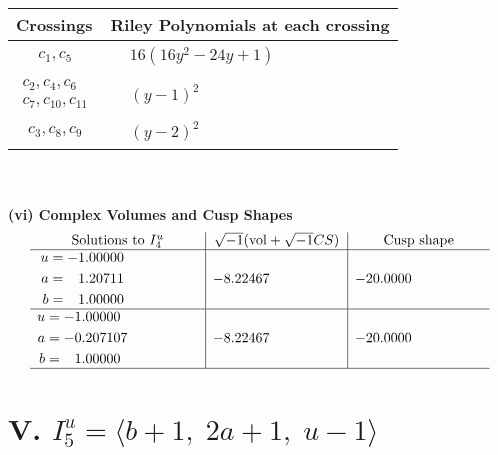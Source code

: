 \documentclass[1p]{elsarticle_modified}
\theoremstyle{definition}
\newcommand{\I}{\sqrt{-1}}
\begin{document}
\begin{tabular}{m{50pt}|m{274pt}}
Crossings & \hspace{64pt}Riley Polynomials at each crossing \\
\hline $$\begin{aligned}c_{1},c_{5}\end{aligned}$$&$\begin{aligned}
&16(16 y^2-24 y+1)
\end{aligned}$\\
\hline $$\begin{aligned}c_{2},c_{4},c_{6}\\c_{7},c_{10},c_{11}\end{aligned}$$&$\begin{aligned}
&(y-1)^2
\end{aligned}$\\
\hline $$\begin{aligned}c_{3},c_{8},c_{9}\end{aligned}$$&$\begin{aligned}
&(y-2)^2
\end{aligned}$\\
\hline
\end{tabular}\\~\\
\newpage\flushleft \textbf{(vi) Complex Volumes and Cusp Shapes}
$$\begin{array}{c|c|c}  
\text{Solutions to }I^u_{4}& \I (\text{vol} + \sqrt{-1}CS) & \text{Cusp shape}\\
 \hline 
\begin{aligned}
u &= -1.00000\phantom{ +0.000000I} \\
a &= \phantom{-}1.20711\phantom{ +0.000000I} \\
b &= \phantom{-}1.00000\phantom{ +0.000000I}\end{aligned}
 & -8.22467\phantom{ +0.000000I} & -20.0000\phantom{ +0.000000I} \\ \hline\begin{aligned}
u &= -1.00000\phantom{ +0.000000I} \\
a &= -0.207107\phantom{ +0.000000I} \\
b &= \phantom{-}1.00000\phantom{ +0.000000I}\end{aligned}
 & -8.22467\phantom{ +0.000000I} & -20.0000\phantom{ +0.000000I}\\
 \hline 
 \end{array}$$\newpage\newpage\renewcommand{\arraystretch}{1}
\centering \section*{V. $I^u_{5}= \langle b+1,\;2 a+1,\;u-1 \rangle$}
\end{document}
